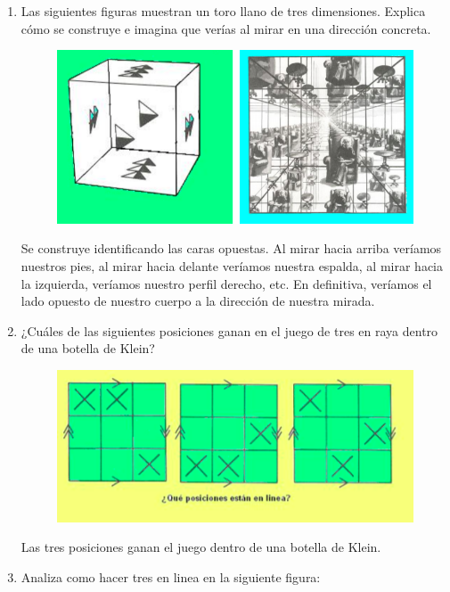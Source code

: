 \begin{enumerate}
\item Las siguientes figuras muestran un toro llano de tres dimensiones. Explica cómo se construye e imagina que verías al mirar en una dirección concreta.

\begin{figure}[H]
\centering
\includegraphics[scale=0.35]{images/universo/pagina_21_2.png}
\end{figure}

Se construye identificando las caras opuestas. Al mirar hacia arriba veríamos nuestros pies, al mirar hacia delante veríamos nuestra espalda, al mirar hacia la izquierda, veríamos nuestro perfil derecho, etc. En definitiva, veríamos el lado opuesto de nuestro cuerpo a la dirección de nuestra mirada.

\item ¿Cuáles de las siguientes posiciones ganan en el juego de tres en raya dentro de una botella de Klein?

\begin{figure}[H]
\centering
\includegraphics[scale=0.5]{images/universo/pagina_24_1.png}
\end{figure}

Las tres posiciones ganan el juego dentro de una botella de Klein.

\item Analiza como hacer tres en linea en la siguiente figura:


\end{enumerate}
